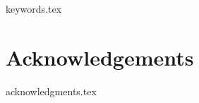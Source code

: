 %

\maketitle
\thispagestyle{empty}
\cleardoublepage


%
\begin{minipage}{\textwidth}
  \vspace*{-6pt}
  \begin{abstract}
    \thispagestyle{plain}          %
    \vspace*{6pt}
    {abstract.tex}
  \end{abstract}

  \begin{keywords}
    {keywords.tex}
  \end{keywords}
\end{minipage}
\cleardoublepage

%
\chapter*{Acknowledgements}
\thispagestyle{plain}
%
{acknowledgments.tex}
\cleardoublepage

%
\tableofcontents
\thispagestyle{plain}
\cleardoublepage

%

\listoffigures
\cleardoublepage

%

\listoftables
\cleardoublepage